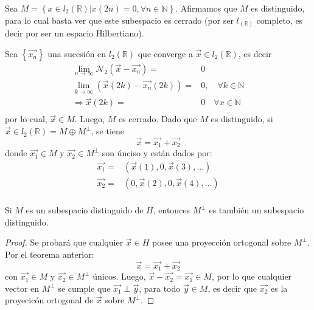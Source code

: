 \documentclass[12pt]{report}
\theoremstyle{largebreak}
\begin{document}
    \begin{exa}
        Sea $M=\left\{x\in l_2(\mathbb{R})\big| x(2n)=0, \forall n\in\mathbb{N} \right\}$. Afirmamos que $M$ es distinguido, para lo cual basta ver que este subespacio es cerrado (por ser $l_(\mathbb{R})$ completo, es decir por ser un espacio Hilbertiano).

        Sea $\left\{\vec{x_n} \right\}$ una sucesión en $l_2(\mathbb{R})$ que converge a $\vec{x}\in l_2(\mathbb{R})$, es decir
        \begin{equation}
            \begin{split}
                \lim_{n\rightarrow \infty}\mathcal{N}_2(\vec{x}-\vec{x_n})=&0\\
                \lim_{k\rightarrow \infty}(\vec{x}(2k)-\vec{x_n}(2k))=&0,\quad \forall k\in\mathbb{N}\\
                \Rightarrow \vec{x}(2k)=&0\quad\forall x\in\mathbb{N}\\ 
            \end{split}
        \end{equation}
        por lo cual, $\vec{x}\in M$. Luego, $M$ es cerrado. Dado que $M$ es distinguido, si $\vec{x}\in l_2(\mathbb{R})=M\oplus M^\perp$, se tiene
        \begin{equation*}
            \vec{x}=\vec{x_1}+\vec{x_2}
        \end{equation*}
        donde $\vec{x_1}\in M$ y $\vec{x_2}\in M^\perp$ son únciso y están dados por:
        \begin{equation*}
            \begin{split}
                \vec{x_1}=&(\vec{x}(1),0,\vec{x}(3),...)\\
                \vec{x_2}=&(0,\vec{x}(2),0,\vec{x}(4),...)\\
            \end{split}
        \end{equation*}
    \end{exa}

    \begin{cor}
        Si $M$ es un subespacio distinguido de $H$, entonces $M^\perp$ es también un subespacio distinguido.
    \end{cor}

    \begin{proof}
        Se probará que cualquier $\vec{x}\in H$ posee una proyección ortogonal sobre $M^\perp$. Por el teorema anterior:
        \begin{equation*}
            \vec{x}=\vec{x_1}+\vec{x_2}
        \end{equation*}
        con $\vec{x_1}\in M$ y $\vec{x_2}\in M^\perp$ únicos. Luego, $\vec{x}-\vec{x_2}=\vec{x_1}\in M$, por lo que cualquier vector en $M^\perp$ se cumple que $\vec{x_1}\perp \vec{y}$, para todo $\vec{y}\in M$, es decir que $\vec{x_2}$ es la proyecicón ortogonal de $\vec{x}$ sobre $M^\perp$.
    \end{proof}
\end{document}
